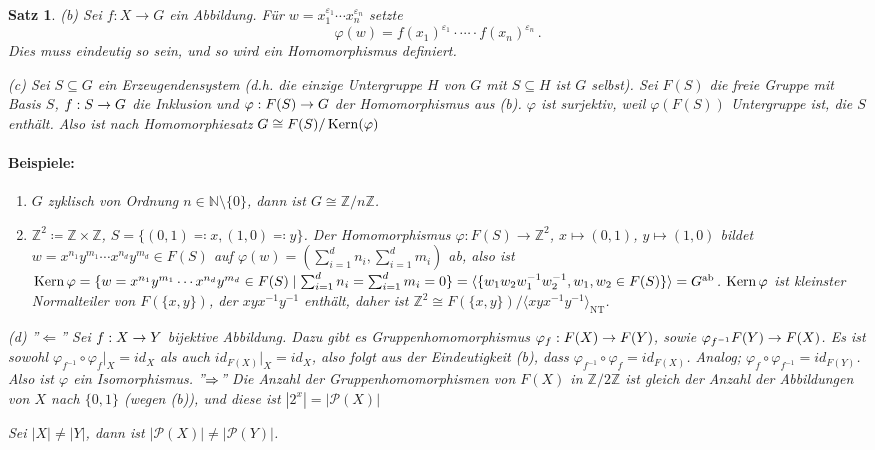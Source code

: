 \documentclass[a4paper,10pt,german]{scrbook}
\newcommand{\da}{\coloneqq}
\newcommand{\ad}{\eqqcolon}
\theoremstyle{saetze}
\newtheorem{Satz}{Satz}
\theoremstyle{definitionen}
\begin{document}
\begin{Satz}
{%
\item[(b)] Sei $f:X\to G$ ein Abbildung. Für $w=x_1^{\varepsilon_1}\cdots x_n^{\varepsilon_n}$ setzte
\[
\varphi(w) = f(x_1)^{\varepsilon_1}\cdot \cdots \cdot f(x_n)^{\varepsilon_n}\,.
\]
Dies muss eindeutig so sein, und so wird ein Homomorphismus definiert.
\item[(c)] Sei $S \subseteq G$ ein Erzeugendensystem (d.h. die einzige
Untergruppe $H$ von $G$ mit $S \subseteq H$ ist $G$ selbst). Sei
$F(S)$ die freie Gruppe mit Basis $S$, $f:S \rightarrow G$ die Inklusion und
$\varphi:F(S) \rightarrow G$ der Homomorphismus aus (b). $\varphi$ ist
surjektiv, weil $\varphi(F(S))$ Untergruppe ist, die $S$ enthält.
Also ist nach Homomorphiesatz $G \cong F(S)/\mathop{\rm Kern}\nolimits(\varphi)$

\paragraph{Beispiele:}
\begin{enumerate}
\item $G$ zyklisch von Ordnung $n\in \mathbb N\setminus \{0\}$, dann ist $G\cong \mathbb Z / n \mathbb Z$.

\item $\mathbb Z^2 \da \mathbb Z \times \mathbb Z$, $S=\{(0,1) \ad x, (1,0) \ad y\}$. Der Homomorphismus $\varphi : F(S) \to \mathbb Z^2$, $x\mapsto (0,1)$, $y\mapsto (1,0)$ bildet $w = x^{n_1}y^{m_1}\cdots x^{n_d}y^{m_d} \in F(S)$ auf $\varphi(w) = (\sum_{i=1}^d n_i, \sum_{i=1}^d m_i)$ ab, also ist $\mathop{\rm Kern}\nolimits\varphi = \{ w = x^{n_1}y^{m_1}\cdots x^{n_d}y^{m_d} \in F(S) \mid \sum_{i=1}^d n_i = \sum_{i=1}^d m_i = 0\} = \langle \{ w_1w_2w_1^{-1}w_2^{-1}, w_1, w_2\in F(S)\}\rangle = G^{\text{ab}}$. $\mathop{\rm Kern}\nolimits\varphi$ ist kleinster Normalteiler von $F(\{x,y\})$, der $xyx^{-1}y^{-1}$ enthält, daher ist $\mathbb Z^2 \cong F(\{x,y\}) / \langle xyx^{-1}y^{-1}\rangle_\text{NT}$.
\end{enumerate}

\item[(d)] ''$\Leftarrow$'' Sei $f:X \rightarrow Y$ bijektive Abbildung. Dazu gibt
es Gruppenhomomorphismus $\varphi_f: F(X) \rightarrow F(Y)$, sowie
$\varphi_{f^{-1}} F(Y) \rightarrow F(X)$.  Es ist sowohl
$\varphi_{f^{-1}} \circ \varphi_{f}
|_X = id_X$ als auch $id_{F(X)}|_X = id_X$, also folgt aus der Eindeutigkeit (b), dass $\varphi_{f^{-1}} \circ \varphi_{f} = id_{F(X)}$. Analog;
$\varphi_f \circ \varphi_{f^{-1}} = id_{F(Y)}$. Also ist $\varphi$ ein Isomorphismus.
\newline ''$\Rightarrow$'' Die Anzahl der
Gruppenhomomorphismen von $F(X)$ in $\mathbb{Z}/2\mathbb{Z}$ ist
gleich der Anzahl der Abbildungen von $X$ nach
$\{0,1\}$ (wegen (b)), und diese ist $|2^x| = |\mathcal P(X)|$

Sei $|X| \neq |Y|$, dann ist $|\mathcal P(X)|\ne |\mathcal P(Y)|$. 
}
\end{Satz}
\end{document}

